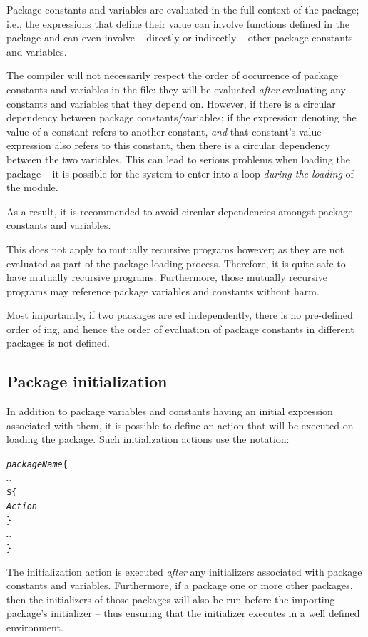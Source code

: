 \begin{aside}
Package constants and variables are evaluated in the full context of the package; i.e., the expressions that define their value can involve functions defined in the package and can even involve -- directly or indirectly -- other package constants and variables.

The compiler will not necessarily respect the order of occurrence of package constants and variables in the file: they will be evaluated \emph{after} evaluating any constants and variables that they depend on. However, if there is a circular dependency between package constants/variables; if the expression denoting the value of a constant refers to another constant, \emph{and} that constant's value expression also refers to this constant, then there is  a circular dependency between the two variables. This can lead to serious problems when loading the package -- it is possible for the \go system to enter into a loop \emph{during the loading} of the module.

As a result, it is recommended to avoid circular dependencies amongst package constants and variables.

This does not apply to mutually recursive programs however; as they are not evaluated as part of the package loading process. Therefore, it is quite safe to have mutually recursive programs. Furthermore, those mutually recursive programs may reference package variables and constants without harm.
\end{aside}

\begin{aside}
Most importantly, if two packages are ed independently, there is no pre-defined order of ing, and hence the order of evaluation of package constants in different packages is not defined.
\end{aside}

\subsection{Package initialization}
\label{package:initialization}

In addition to package variables and constants having an initial expression associated with them, it is possible to define an action that will be executed on loading the package. Such initialization actions use the notation:
\begin{alltt}
\emph{packageName}\{
  \ldots
  \$ \{
    \emph{Action}
  \}
  \ldots
\}
\end{alltt}
The initialization action is executed \emph{after} any initializers associated with package constants and variables. Furthermore, if a package  one or more other packages, then the initializers of those packages will also be run before the importing package's initializer -- thus ensuring that the initializer executes in a well defined environment.

